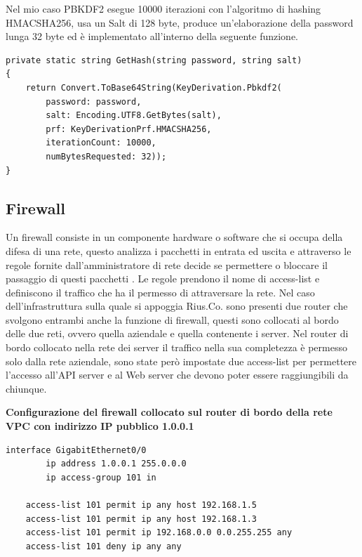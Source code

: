 \medskip
Nel mio caso PBKDF2 esegue 10000 iterazioni con l'algoritmo di hashing HMACSHA256, usa un Salt di 128 byte, produce un'elaborazione della password lunga 32 byte ed è implementato all'interno della seguente funzione. 
\smallskip

\begin{lstlisting}[style=csharp]
private static string GetHash(string password, string salt)
{
    return Convert.ToBase64String(KeyDerivation.Pbkdf2(
        password: password,
        salt: Encoding.UTF8.GetBytes(salt),
        prf: KeyDerivationPrf.HMACSHA256,
        iterationCount: 10000,
        numBytesRequested: 32));
}
\end{lstlisting}
\subsection{Firewall}
Un firewall consiste in un componente hardware o software che si occupa della difesa di una rete, questo analizza i pacchetti in entrata ed uscita e attraverso le regole fornite dall'amministratore di rete decide se permettere o bloccare il passaggio di questi pacchetti \cite{Firewall}. Le regole prendono il nome di access-list e definiscono il traffico che ha il permesso di attraversare la rete. Nel caso dell'infrastruttura sulla quale si appoggia Rius.Co. sono presenti due router che svolgono entrambi anche la funzione di firewall, questi sono collocati al bordo delle due reti, ovvero quella aziendale e quella contenente i server. Nel router di bordo collocato nella rete dei server il traffico nella sua completezza è permesso solo dalla rete aziendale, sono state però impostate due access-list per permettere l'accesso all'API server e al Web server che devono poter essere raggiungibili da chiunque. 
\bigskip

\textbf{Configurazione del firewall collocato sul router di bordo della rete VPC con indirizzo IP pubblico 1.0.0.1}
\begin{lstlisting}[style=dos]
    interface GigabitEthernet0/0
        ip address 1.0.0.1 255.0.0.0
        ip access-group 101 in
        
    access-list 101 permit ip any host 192.168.1.5
    access-list 101 permit ip any host 192.168.1.3
    access-list 101 permit ip 192.168.0.0 0.0.255.255 any
    access-list 101 deny ip any any
\end{lstlisting}
